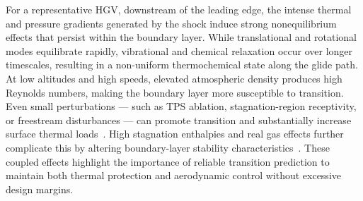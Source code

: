 
For a representative \gls{HGV}, downstream of the leading edge, the intense thermal and pressure gradients generated by the shock induce strong nonequilibrium effects that persist within the boundary layer. While translational and rotational modes equilibrate rapidly, vibrational and chemical relaxation occur over longer timescales, resulting in a non-uniform thermochemical state along the glide path. At low altitudes and high speeds, elevated atmospheric density produces high Reynolds numbers, making the boundary layer more susceptible to transition. Even small perturbations — such as \gls{TPS} ablation, stagnation-region receptivity, or freestream disturbances — can promote transition and substantially increase surface thermal loads~\citep{miromiroThesis}. High stagnation enthalpies and real gas effects further complicate this by altering boundary-layer stability characteristics~\citep{Anderson2019}. These coupled effects highlight the importance of reliable transition prediction to maintain both thermal protection and aerodynamic control without excessive design margins.


